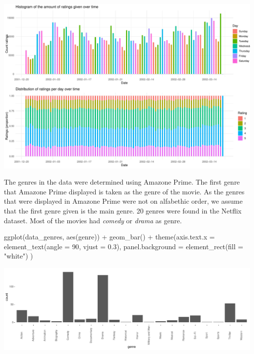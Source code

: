 \documentclass[
  man]{apa6}
\newenvironment{Shaded}{\begin{snugshade}}{\end{snugshade}}
\newcommand{\AttributeTok}[1]{\textcolor[rgb]{0.77,0.63,0.00}{#1}}
\newcommand{\DecValTok}[1]{\textcolor[rgb]{0.00,0.00,0.81}{#1}}
\newcommand{\FloatTok}[1]{\textcolor[rgb]{0.00,0.00,0.81}{#1}}
\newcommand{\FunctionTok}[1]{\textcolor[rgb]{0.00,0.00,0.00}{#1}}
\newcommand{\NormalTok}[1]{#1}
\newcommand{\SpecialCharTok}[1]{\textcolor[rgb]{0.00,0.00,0.00}{#1}}
\newcommand{\StringTok}[1]{\textcolor[rgb]{0.31,0.60,0.02}{#1}}
\begin{document}
\includegraphics{SNA4DSprojectReport_files/figure-latex/unnamed-chunk-5-1.pdf}

The genres in the data were determined using Amazone Prime. The first
genre that Amazone Prime displayed is taken as the genre of the movie.
As the genres that were displayed in Amazone Prime were not on
alfabethic order, we assume that the first genre given is the main
genre. 20 genres were found in the Netflix dataset. Most of the movies
had \emph{comedy} or \emph{drama} as genre.

\begin{Shaded}
\begin{Highlighting}[]
\FunctionTok{ggplot}\NormalTok{(data\_genres, }\FunctionTok{aes}\NormalTok{(genre)) }\SpecialCharTok{+}
    \FunctionTok{geom\_bar}\NormalTok{() }\SpecialCharTok{+}
    \FunctionTok{theme}\NormalTok{(}\AttributeTok{axis.text.x =} \FunctionTok{element\_text}\NormalTok{(}\AttributeTok{angle =} \DecValTok{90}\NormalTok{, }\AttributeTok{vjust =} \FloatTok{0.3}\NormalTok{), }
          \AttributeTok{panel.background =} \FunctionTok{element\_rect}\NormalTok{(}\AttributeTok{fill =} \StringTok{"white"}\NormalTok{)}
\NormalTok{          )}
\end{Highlighting}
\end{Shaded}

\includegraphics{SNA4DSprojectReport_files/figure-latex/unnamed-chunk-6-1.pdf}
\end{document}
